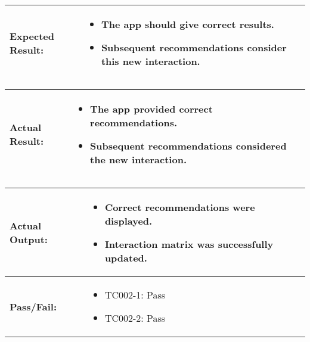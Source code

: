 \documentclass{article}
\begin{document}
\noindent
\begin{tabularx}{\textwidth}{|>{\raggedright\arraybackslash}p{4cm}|X|}
    \hline
    \textbf{Expected Result:} & 
    \begin{itemize}
        \item The app should give correct results.
        \item Subsequent recommendations consider this new interaction.
    \end{itemize}
    \\ \hline
\end{tabularx}

\noindent
\begin{tabularx}{\textwidth}{|>{\raggedright\arraybackslash}p{4cm}|X|}
    \hline
    \textbf{Actual Result:} & 
    \begin{itemize}
        \item The app provided correct recommendations.
        \item Subsequent recommendations considered the new interaction.
    \end{itemize}
    \\ \hline
\end{tabularx}

\noindent
\begin{tabularx}{\textwidth}{|>{\raggedright\arraybackslash}p{4cm}|X|}
    \hline
    \textbf{Actual Output:} & 
    \begin{itemize}
        \item Correct recommendations were displayed.
        \item Interaction matrix was successfully updated.
    \end{itemize}
    \\ \hline
    \textbf{Pass/Fail:} & 
    \begin{itemize}
        \item TC002-1: Pass
        \item TC002-2: Pass
    \end{itemize}
    \\ \hline
\end{tabularx}
\end{document}
